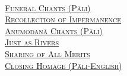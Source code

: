 \begin{center}
  {\libertinusFont\selectfont\textbf{\textsc{}}}\\

  \textsc{
    \hyperref[pubba-bhaga-nama-kara-patho]{Funeral Chants (Pāli)}\\
    \hyperref[recollection-impermanence]{Recollection of Impermanence}\\
    \hyperref[yatha-vari-vaha-pura]{Anumodanā Chants (Pāli)}\\
    \hyperref[just-as-rivers]{Just as Rivers}\\
    \hyperref[sharing-all-merits]{Sharing of All Merits}\\
    \hyperref[closing-homage]{Closing Homage (Pāli-English)}}\\

\end{center}
